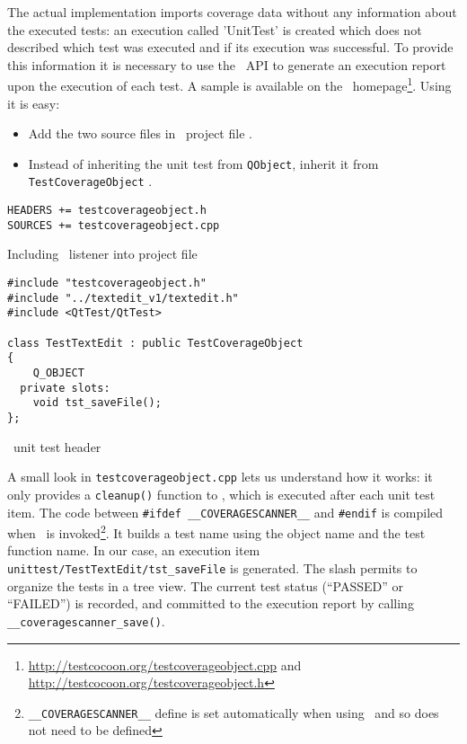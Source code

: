 The actual implementation imports coverage data without any information about
the executed tests: an execution called '\textsf{UnitTest}' is created which does
not described which test was executed and if its execution was successful.
To provide this information it is necessary to use the \CoverageScanner\ API to
generate an execution report upon the execution of each test. A sample is
available on the \TestCocoon\
homepage\footnote{\url{http://testcocoon.org/testcoverageobject.cpp} and
\url{http://testcocoon.org/testcoverageobject.h}}. Using it is easy: 
\begin{itemize}
  \item Add the two source files in \qmake\ project file .
  \item Instead of inheriting the unit test from \texttt{QObject}, inherit it
    from \texttt{TestCoverageObject} \seelstref{lst:hdr1}.
\end{itemize}

\begin{figureenv}
  \scriptsize
\begin{verbatim}
HEADERS += testcoverageobject.h
SOURCES += testcoverageobject.cpp
\end{verbatim}
\caption{Including \CoverageScanner\ listener into {\qmake} project file}
\label{lst:qmake5}
\end{figureenv}

\begin{figureenv}
  \scriptsize
\begin{verbatim}
#include "testcoverageobject.h"
#include "../textedit_v1/textedit.h"
#include <QtTest/QtTest>

class TestTextEdit : public TestCoverageObject
{
    Q_OBJECT
  private slots:
    void tst_saveFile();
};
\end{verbatim}
\caption{\TextEdit\ unit test header}
\label{lst:hdr1}
\end{figureenv}

A small look in \texttt{testcoverageobject.cpp}  lets
us understand how it works: it only provides a \verb$cleanup()$ function to
\QTestLib, which is executed after each unit test item.
The code between \verb$#ifdef __COVERAGESCANNER__$ and \verb$#endif$ is 
compiled when \CoverageScanner\ is invoked\footnote{\texttt{\_\_COVERAGESCANNER\_\_} define
is set automatically when using \CoverageScanner\ and so does not need to be
defined}. It builds a test name using the object name and the test function
name. In our case, an execution item \verb$unittest/TestTextEdit/tst_saveFile$
is generated. The slash permits to organize the tests in a tree view.
The current test status (``PASSED'' or ``FAILED'') is recorded, and
committed to the execution report by calling \verb$__coveragescanner_save()$.


